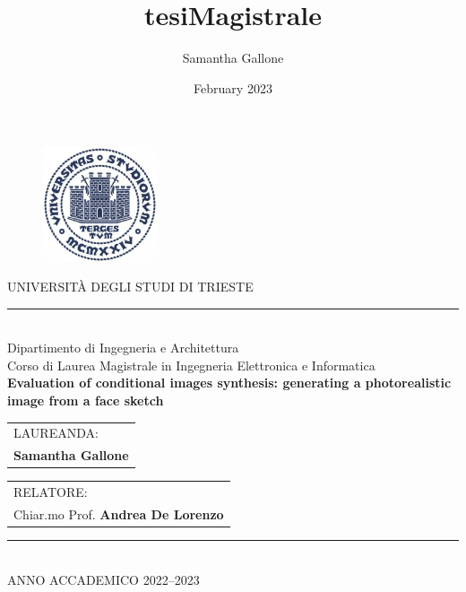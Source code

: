 \documentclass[paper=a4, fontsize=14pt, titlepage, oneside]{article}
\title{tesiMagistrale}
\author{Samantha Gallone}
\date{February 2023}
\begin{document}
\thispagestyle{empty}
\setcounter{page}{0}

 \begin{figure}[htbp]
	\centering
	\includegraphics[width=%
	 0.3\textwidth]{figures/logo_units.jpg}
	\end{figure}
\begin{center}

\LARGE
UNIVERSIT\`A DEGLI STUDI DI TRIESTE\\
\vspace{-0.4cm}
\rule{8cm}{0.2mm}\\
\Large
Dipartimento di Ingegneria e Architettura\\
\bigskip
\large
Corso di Laurea Magistrale in Ingegneria Elettronica e Informatica \\
\vfill %
{}
\huge{\textbf{Evaluation of conditional images synthesis: generating a photorealistic image from a face sketch}}\\
\vfill %
{}
\end{center}
\vfill
%
\begin{tabular}[t]{l}
LAUREANDA:\\
\large
\textbf{Samantha Gallone}
\end{tabular}
\hfill 
%
\begin{tabular}[t]{l}
RELATORE: \\
\large
Chiar.mo Prof. \textbf{Andrea De Lorenzo}
\end{tabular}
\vfill
\begin{center}
\normalsize
\rule{8cm}{0.1mm}\\
\bigskip
ANNO ACCADEMICO 2022--2023
\end{center}
\end{document}
